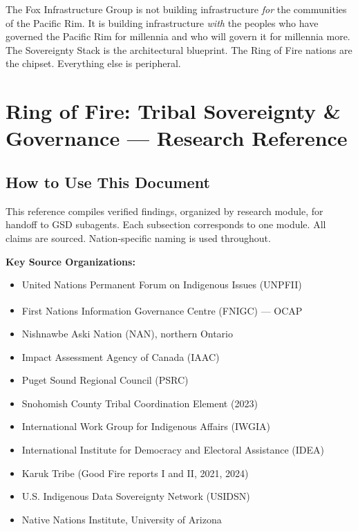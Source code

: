 \documentclass[11pt,letterpaper]{article}
\newcommand{\stageheader}[2]{%
  \noindent\colorbox{#2}{\makebox[\textwidth][l]{%
    \textcolor{white}{\bfseries\sffamily\hspace{6pt}#1\hspace{6pt}}}}%
  \vspace{0.5em}\par%
}
\begin{document}
The Fox Infrastructure Group is not building infrastructure \textit{for} the communities of the Pacific Rim. It is building infrastructure \textit{with} the peoples who have governed the Pacific Rim for millennia and who will govern it for millennia more. The Sovereignty Stack is the architectural blueprint. The Ring of Fire nations are the chipset. Everything else is peripheral.

\newpage

\stageheader{STAGE 2 --- RESEARCH REFERENCE}{secondary}

\section{Ring of Fire: Tribal Sovereignty \& Governance --- Research Reference}

\subsection{How to Use This Document}

This reference compiles verified findings, organized by research module, for handoff to GSD subagents. Each subsection corresponds to one module. All claims are sourced. Nation-specific naming is used throughout.

\textbf{Key Source Organizations:}

\begin{itemize}
  \item United Nations Permanent Forum on Indigenous Issues (UNPFII)
  \item First Nations Information Governance Centre (FNIGC) --- OCAP\textsuperscript{\textregistered}
  \item Nishnawbe Aski Nation (NAN), northern Ontario
  \item Impact Assessment Agency of Canada (IAAC)
  \item Puget Sound Regional Council (PSRC)
  \item Snohomish County Tribal Coordination Element (2023)
  \item International Work Group for Indigenous Affairs (IWGIA)
  \item International Institute for Democracy and Electoral Assistance (IDEA)
  \item Karuk Tribe (Good Fire reports I and II, 2021, 2024)
  \item U.S. Indigenous Data Sovereignty Network (USIDSN)
  \item Native Nations Institute, University of Arizona
\end{itemize}
\end{document}
